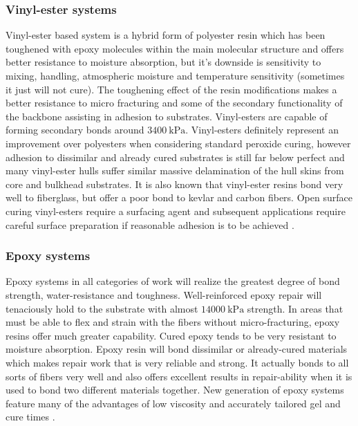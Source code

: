 \subsubsection{Vinyl-ester systems}\label{subsec:vinyl_ester}
Vinyl-ester based system is a hybrid form of polyester resin which has been toughened with epoxy molecules within the main molecular structure and offers better resistance to moisture absorption, but it's downside is sensitivity to mixing, handling, atmospheric moisture and temperature sensitivity (sometimes it just will not cure). The toughening effect of the resin modifications makes a better resistance to micro fracturing and some of the secondary functionality of the backbone assisting in adhesion to substrates. Vinyl-esters are capable of forming secondary bonds around $3400~\mathrm{kPa}$. Vinyl-esters definitely represent an improvement over polyesters when considering standard peroxide curing, however adhesion to dissimilar and already cured substrates is still far below perfect and many vinyl-ester hulls suffer similar massive delamination of the hull skins from core and bulkhead substrates. It is also known that vinyl-ester resins bond very well to fiberglass, but offer a poor bond to kevlar and carbon fibers.  Open surface curing vinyl-esters require a surfacing agent and subsequent applications require careful surface preparation if reasonable adhesion is to be achieved \cite{thermosetting_polymers}.

\subsubsection{Epoxy systems}\label{subsec:epoxy_systems}
Epoxy systems in all categories of work will realize the greatest degree of bond strength, water-resistance and toughness. Well-reinforced epoxy repair will tenaciously hold to the substrate with almost $14 000~\mathrm{kPa}$ strength. In areas that must be able to flex and strain with the fibers without micro-fracturing, epoxy resins offer much greater capability. Cured epoxy tends to be very resistant to moisture absorption. Epoxy resin will bond dissimilar or already-cured materials which makes repair work that is  very reliable and strong. It actually bonds to all sorts of fibers very well and also offers excellent results in repair-ability when it is used to bond two different materials together. New generation of epoxy systems feature many of the advantages of low viscosity and accurately tailored gel and cure times \cite{thermosetting_polymers}. 

